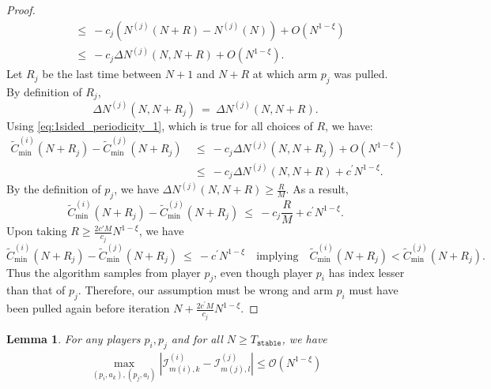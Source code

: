 \documentclass{article}
\newtheorem{lemma}[theorem]{Lemma}
\begin{document}
\begin{proof}
\begin{align}
    &\leq~-c_j(N^{(j)}(N+R)-N^{(j)}(N))+O(N^{1-\xi})\nonumber\\
    &\leq~-c_j \Delta N^{(j)}(N,N+R)+O(N^{1-\xi}).
\end{align}
Let $R_j$ be the last time between $N+1$ and $N+R$ at which arm $p_j$ was pulled. By definition of $R_j$, 
\[\Delta N^{(j)}(N,N+R_j)~=~\Delta N^{(j)}(N,N+R).\]
Using \ref{eq:1sided_periodicity_1}, which is true for all choices of $R$, we have: 
\begin{align*}
    \tilde{C}_{\min}^{(i)}(N+R_j)-\tilde{C}_{\min}^{(j)}(N+R_j)~&\leq~-c_j \Delta N^{(j)}(N,N+R_j)+O(N^{1-\xi})\\
    ~&\leq ~-c_j \Delta N^{(j)}(N,N+R)+c^\prime N^{1-\xi}.
\end{align*}
By the definition of $p_j$, we have $\Delta N^{(j)}(N,N+R)\geq\frac{R}{M}$. As a result, 
\[\tilde{C}_{\min}^{(i)}(N+R_j)-\tilde{C}_{\min}^{(j)}(N+R_j)~\leq~-c_j \frac{R}{M}+c^\prime N^{1-\xi}.\]
Upon taking $R\geq \frac{2c' M}{c_j}N^{1-\xi}$, we have
\[\tilde{C}_{\min}^{(i)}(N+R_j)-\tilde{C}_{\min}^{(j)}(N+R_j)~\leq~-c^\prime N^{1-\xi} \quad \text{implying}\quad \tilde{C}_{\min}^{(i)}(N+R_j)<\tilde{C}_{\min}^{(j)}(N+R_j).\]
Thus the algorithm samples from player $p_j$, even though player $p_i$ has index lesser than that of $p_j$. Therefore, our assumption must be wrong and arm $p_i$ must have been pulled again before iteration $N+\frac{2c^\prime M}{c_j}N^{1-\xi}$. 
\end{proof}

\begin{lemma}
    For any players $p_i,p_j$ and for all $N\geq T_{\texttt{stable}}$, we have
\begin{align*}
    \max_{(p_i,a_k),(p_j,a_l)}|\mathcal{I}^{(i)}_{m(i),k}-\mathcal{I}^{(j)}_{m(j),l}|\leq \mathcal{O}(N^{1-\xi})
\end{align*}
\end{lemma}
\end{document}
